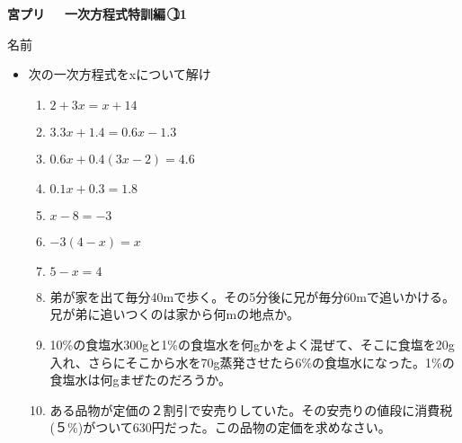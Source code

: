 \documentclass[a4paper,fleqn,papersize,15pt]{jsarticle}
\begin{document}
\clearpage
 \begin{center}
   \LARGE\textbf{宮プリ　~一次方程式特訓編~\textcircled{\scriptsize 11}}
     \begin{flushright}
       名前\underline{\hspace{8zw}}
     \end{flushright}
 \end{center}

 \begin{itemize}
   \item 次の一次方程式をxについて解け
   \begin{enumerate}
\item $2+3x=x+14$ \begin{flushright}\framebox[8em]{\rule{0pt}{6ex}}\end{flushright} %
\item $3.3x+1.4=0.6x-1.3$ \begin{flushright}\framebox[8em]{\rule{0pt}{6ex}}\end{flushright} %
\item $0.6x+0.4(3x-2)=4.6$ \begin{flushright}\framebox[8em]{\rule{0pt}{6ex}}\end{flushright} %
\item $0.1x+0.3=1.8$ \begin{flushright}\framebox[8em]{\rule{0pt}{6ex}}\end{flushright} %
\item $x-8=-3$ \begin{flushright}\framebox[8em]{\rule{0pt}{6ex}}\end{flushright} %
\item $-3(4-x)=x$ \begin{flushright}\framebox[8em]{\rule{0pt}{6ex}}\end{flushright} %
\item $5-x=4$ \begin{flushright}\framebox[8em]{\rule{0pt}{6ex}}\end{flushright} %
\item 弟が家を出て毎分40mで歩く。その5分後に兄が毎分60mで追いかける。兄が弟に追いつくのは家から何mの地点か。 \vfill \begin{flushright}\framebox[8em]{\rule{0pt}{6ex}}\end{flushright} %
\item 10\%の食塩水300gと1\%の食塩水を何gかをよく混ぜて、そこに食塩を20g入れ、さらにそこから水を70g蒸発させたら6\%の食塩水になった。1\%の食塩水は何gまぜたのだろうか。 \vfill \begin{flushright}\framebox[8em]{\rule{0pt}{6ex}}\end{flushright} %
\item ある品物が定価の２割引で安売りしていた。その安売りの値段に消費税(５\%)がついて630円だった。この品物の定価を求めなさい。 \vfill \begin{flushright}\framebox[8em]{\rule{0pt}{6ex}}\end{flushright} %
\end{enumerate}
    \vfill
\end{itemize}
\end{document}
